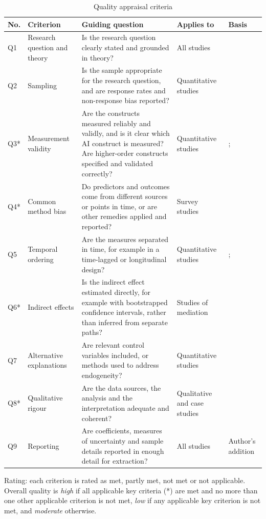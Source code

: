 \begin{table}[htbp]
\centering
\caption{Quality appraisal criteria}
\label{tab:quality}
\footnotesize
\renewcommand{\arraystretch}{1.1}\setlength{\tabcolsep}{4pt}
\begin{tabularx}{\textwidth}{|p{0.6cm}|>{\raggedright\arraybackslash}p{2.3cm}|>{\raggedright\arraybackslash}X|>{\raggedright\arraybackslash}p{2.1cm}|>{\raggedright\arraybackslash}p{2.4cm}|}
\hline
\textbf{No.} & \textbf{Criterion} & \textbf{Guiding question} & \textbf{Applies to} & \textbf{Basis} \\
\hline
Q1 & Research question and theory & Is the research question clearly stated and grounded in theory? & All studies & \textcite{hong2018} \\ \hline
Q2 & Sampling & Is the sample appropriate for the research question, and are response rates and non-response bias reported? & Quantitative studies & \textcite{hong2018} \\ \hline
Q3* & Measurement validity & Are the constructs measured reliably and validly, and is it clear which AI construct is measured? Are higher-order constructs specified and validated correctly? & Quantitative studies & \textcite{hong2018}; \textcite{sarstedt2019} \\ \hline
Q4* & Common method bias & Do predictors and outcomes come from different sources or points in time, or are other remedies applied and reported? & Survey studies & \textcite{podsakoff2024} \\ \hline
Q5 & Temporal ordering & Are the measures separated in time, for example in a time-lagged or longitudinal design? & Quantitative studies & \textcite{hill2021}; \textcite{rohrer2022} \\ \hline
Q6* & Indirect effects & Is the indirect effect estimated directly, for example with bootstrapped confidence intervals, rather than inferred from separate paths? & Studies of mediation & \textcite{zhao2010} \\ \hline
Q7 & Alternative explanations & Are relevant control variables included, or methods used to address endogeneity? & Quantitative studies & \textcite{hill2021} \\ \hline
Q8* & Qualitative rigour & Are the data sources, the analysis and the interpretation adequate and coherent? & Qualitative and case studies & \textcite{hong2018} \\ \hline
Q9 & Reporting & Are coefficients, measures of uncertainty and sample details reported in enough detail for extraction? & All studies & Author's addition \\
\hline
\end{tabularx}
\par\smallskip
{\footnotesize\raggedright Rating: each criterion is rated as met, partly met, not met or not applicable. Overall quality is \textit{high} if all applicable key criteria (*) are met and no more than one other applicable criterion is not met, \textit{low} if any applicable key criterion is not met, and \textit{moderate} otherwise.\par}
\end{table}

